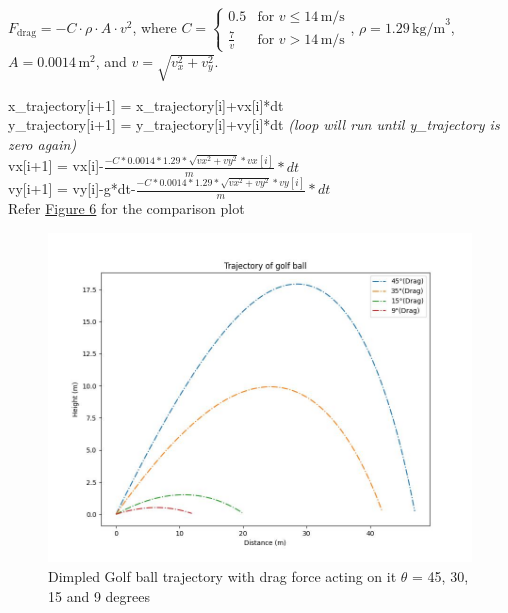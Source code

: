 \documentclass[11pt]{article}
\begin{document}
\( F_{\text{drag}} = -C \cdot \rho \cdot A \cdot v^2 \), where \( C = \begin{cases} 0.5 & \text{for } v \leq 14 \, \text{m/s} \\ \frac{7}{v} & \text{for } v > 14 \, \text{m/s} \end{cases} \), \( \rho = 1.29 \, \text{kg/m}^3 \), \( A = 0.0014 \, \text{m}^2 \), and \( v = \sqrt{v_x^2 + v_y^2} \).
\begin{raggedright}
\begin{justify}
x\_trajectory[i+1] = x\_trajectory[i]+vx[i]*dt\\
y\_trajectory[i+1] = y\_trajectory[i]+vy[i]*dt \textit{(loop will run until y\_trajectory is zero again)}\\
vx[i+1] = vx[i]-$\frac{-C*0.0014*1.29*\sqrt{vx^2+vy^2}*vx[i]}{m}*dt$\\
vy[i+1] = vy[i]-g*dt-$\frac{-C*0.0014*1.29*\sqrt{vx^2+vy^2}*vy[i]}{m}*dt$\\
Refer \hyperref[fig:Dimpled_Fdrag_trajectory]{Figure 6} for the comparison plot
\end{justify}
\end{raggedright}

\begin{figure}[b]
    \centering
    \includegraphics[width=\textwidth, height=\textheight, keepaspectratio]{Golf_Trajectory_Smooth_Drag.jpeg}
    \caption{Dimpled Golf ball trajectory with drag force acting on it $\theta$ = 45, 30, 15 and 9 degrees}
    \label{fig:Dimpled_Fdrag_trajectory}
\end{figure}
\end{document}
